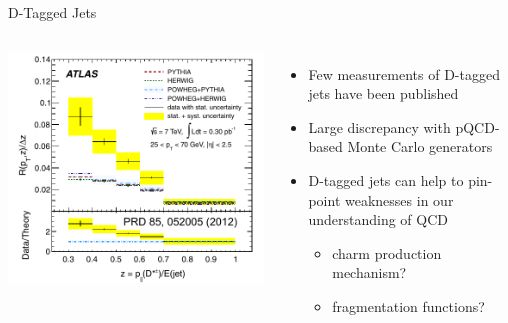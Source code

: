 \documentclass[xcolor={usenames,dvipsnames}]{beamer}
\begin{document}
\begin{frame}{D-Tagged Jets}
\begin{columns}
\includegraphics[width=\textwidth]{img/ATLAS_DStarJets}

\begin{itemize}
\item \alert{Few measurements} of D-tagged jets have been published
\item \alert{Large discrepancy} with pQCD-based Monte Carlo generators
\item D-tagged jets can help to pin-point weaknesses in our understanding of QCD
\begin{itemize}
\item charm production mechanism?
\item fragmentation functions?
\end{itemize}
\end{itemize}
\end{columns}
\end{frame}
\end{document}
